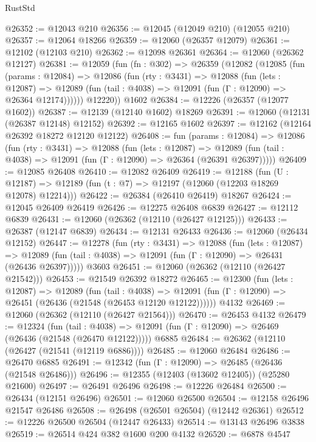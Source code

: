 \begin{lexlean}{RustStd}
\begin{coremodule}
@26352 := @12043 @210
@26356 := @12045 (@12049 @210) (@12055 @210)
@26357 := @12064 @18266
@26359 := @12060 (@26357 @12079)
@26361 := @12102 (@12103 @210)
@26362 := @12098 @26361
@26364 := @12060 (@26362 @12127)
@26381 := @12059
    (fun (fn : @302) =>
    @26359
      (@12082
        (@12085
          (fun (params : @12084) =>
          @12086
            (fun (rty : @3431) =>
            @12088
              (fun (lets : @12087) =>
              @12089 (fun (tail : @4038) => @12091 (fun (Γ : @12090) => @26364 @12174))))))
        @12220))
    @1602
@26384 := @12226 (@26357 (@12077 @1602))
@26387 := @12139 (@12140 @1602) @18269
@26391 := @12060 (@12131 (@26387 @12148) @12152)
@26392 := @12165 @1602
@26397 := @12162 (@12164 @26392 @18272 @12120 @12122)
@26408 := fun (params : @12084) =>
  @12086
    (fun (rty : @3431) =>
    @12088
      (fun (lets : @12087) =>
      @12089 (fun (tail : @4038) => @12091 (fun (Γ : @12090) => @26364 (@26391 @26397)))))
@26409 := @12085 @26408
@26410 := @12082 @26409
@26419 := @12188
    (fun (U : @12187) => @12189 (fun (t : @7) => @12197 (@12060 (@12203 @18269 @12078) @12214)))
@26422 := @26384 (@26410 @26419) @18267
@26424 := @12045 @26409 @26419
@26426 := @12275 @26408 @6839
@26427 := @12112 @6839
@26431 := @12060 (@26362 (@12110 (@26427 @12125)))
@26433 := @26387 (@12147 @6839)
@26434 := @12131 @26433
@26436 := @12060 (@26434 @12152)
@26447 := @12278
    (fun (rty : @3431) =>
    @12088
      (fun (lets : @12087) =>
      @12089 (fun (tail : @4038) => @12091 (fun (Γ : @12090) => @26431 (@26436 @26397)))))
    @3603
@26451 := @12060 (@26362 (@12110 (@26427 @21542)))
@26453 := @21549 @26392 @18272
@26465 := @12300
    (fun (lets : @12087) =>
    @12089
      (fun (tail : @4038) =>
      @12091 (fun (Γ : @12090) => @26451 (@26436 (@21548 (@26453 @12120 @12122))))))
    @4132
@26469 := @12060 (@26362 (@12110 (@26427 @21564)))
@26470 := @26453 @4132
@26479 := @12324
    (fun (tail : @4038) => @12091 (fun (Γ : @12090) => @26469 (@26436 (@21548 (@26470 @12122)))))
    @6885
@26484 := @26362 (@12110 (@26427 (@21541 (@12119 @6886))))
@26485 := @12060 @26484
@26486 := @26470 @6885
@26491 := @12342 (fun (Γ : @12090) => @26485 (@26436 (@21548 @26486)))
@26496 := @12355 (@12403 (@13602 @12405)) (@25280 @21600)
@26497 := @26491 @26496
@26498 := @12226 @26484
@26500 := @26434 (@12151 @26496)
@26501 := @12060 @26500
@26504 := @12158 @26496 @21547 @26486
@26508 := @26498 (@26501 @26504) (@12442 @26361)
@26512 := @12226 @26500 @26504 (@12447 @26433)
@26514 := @13143 @26496 @3838
@26519 := @26514 @424 @382 @1600 @200 @4132
@26520 := @6878 @4547

\end{coremodule}
\end{lexlean}
